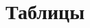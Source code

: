 \documentclass[newPxFont]{beamer}
\begin{document}
\begin{frame}{ } 

\end{frame}

\section{Таблицы} 

\begin{frame}{ } 

\end{frame}

\begin{frame}{ } 

\end{frame}
\end{document}
